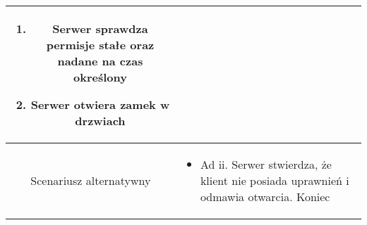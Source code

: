 \documentclass{article}
\begin{document}
\begin{enumerate}
\begin{enumerate}
\begin{table}[H]
\begin{tabular}{|c|p{7cm}|}
\begin{enumerate}
\item Serwer sprawdza permisje stałe oraz nadane na czas określony

\item Serwer otwiera zamek w drzwiach\end{enumerate} \\
						\hline
						Scenariusz alternatywny & \begin{itemize}\item Ad ii. Serwer stwierdza, że klient nie posiada uprawnień i odmawia otwarcia. Koniec\end{itemize}                                                                                    \\
						\hline
					\end{tabular}
				\end{table}


\end{enumerate}
\end{enumerate}
\end{document}
